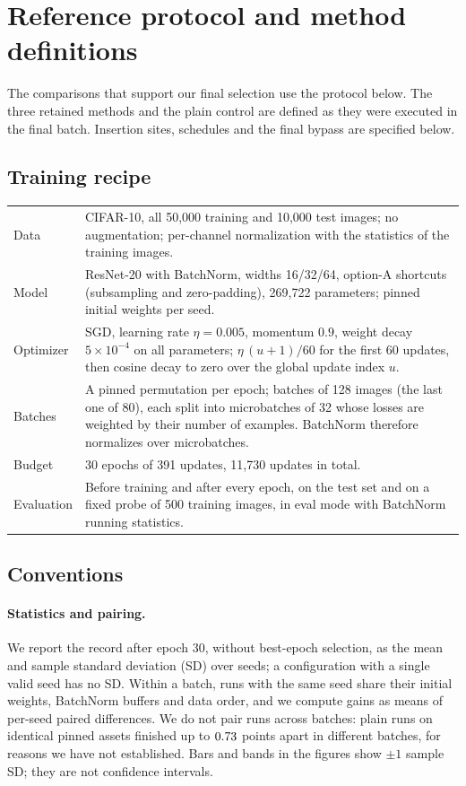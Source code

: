 \section{Reference protocol and method definitions}
\label{app:protocol}
The comparisons that support our final selection use the protocol below. The three retained methods and the plain control are defined as they were executed in the final batch. Insertion sites, schedules and the final bypass are specified below.

\subsection{Training recipe}
\begin{center}\small
\begin{tabularx}{\linewidth}{@{}lX@{}}
\toprule
Data & CIFAR-10, all 50,000 training and 10,000 test images; no augmentation; per-channel normalization with the statistics of the training images.\\
Model & ResNet-20 with BatchNorm, widths 16/32/64, option-A shortcuts (subsampling and zero-padding), 269,722 parameters; pinned initial weights per seed.\\
Optimizer & SGD, learning rate $\eta=0.005$, momentum $0.9$, weight decay $5\times10^{-4}$ on all parameters; $\eta\,(u+1)/60$ for the first 60 updates, then cosine decay to zero over the global update index $u$.\\
Batches & A pinned permutation per epoch; batches of 128 images (the last one of 80), each split into microbatches of 32 whose losses are weighted by their number of examples. BatchNorm therefore normalizes over microbatches.\\
Budget & 30 epochs of 391 updates, 11,730 updates in total.\\
Evaluation & Before training and after every epoch, on the test set and on a fixed probe of 500 training images, in eval mode with BatchNorm running statistics.\\
\bottomrule
\end{tabularx}
\end{center}

\subsection{Conventions}
\label{app:conventions}
\paragraph{Statistics and pairing.} We report the record after epoch 30, without best-epoch selection, as the mean and sample standard deviation (SD) over seeds; a configuration with a single valid seed has no SD. Within a batch, runs with the same seed share their initial weights, BatchNorm buffers and data order, and we compute gains as means of per-seed paired differences. We do not pair runs across batches: plain runs on identical pinned assets finished up to $0.73$ points apart in different batches, for reasons we have not established. Bars and bands in the figures show $\pm1$ sample SD; they are not confidence intervals.


